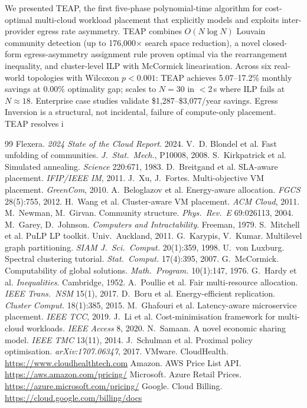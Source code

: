 \documentclass[sigconf,10pt]{acmart}
\begin{document}
We presented TEAP, the first five-phase polynomial-time algorithm for cost-optimal
multi-cloud workload placement that explicitly models and exploits inter-provider
egress rate asymmetry.
TEAP combines $O(N\log N)$ Louvain community detection (up to 176{,}000$\times$ search
space reduction), a novel closed-form egress-asymmetry assignment rule proven optimal
via the rearrangement inequality, and cluster-level ILP with McCormick linearisation.
Across six real-world topologies with Wilcoxon $p < 0.001$: TEAP achieves
5.07--17.2\% monthly savings at 0.00\% optimality gap; scales to $N=30$ in $<$2\,s
where ILP fails at $N\approx18$.
Enterprise case studies validate \$1,287--\$3,077/year savings.
Egress Inversion is a structural, not incidental, failure of compute-only placement.
TEAP resolves i
\begin{thebibliography}{99}
Flexera. \textit{2024 State of the Cloud Report}. 2024.
V.~D. Blondel et al. Fast unfolding of communities. \textit{J.~Stat.~Mech.}, P10008, 2008.
S.~Kirkpatrick et al. Simulated annealing. \textit{Science} 220:671, 1983.
D.~Breitgand et al. SLA-aware placement. \textit{IFIP/IEEE IM}, 2011.
J.~Xu, J.~Fortes. Multi-objective VM placement. \textit{GreenCom}, 2010.
A.~Beloglazov et al. Energy-aware allocation. \textit{FGCS} 28(5):755, 2012.
H.~Wang et al. Cluster-aware VM placement. \textit{ACM Cloud}, 2011.
M.~Newman, M.~Girvan. Community structure. \textit{Phys.~Rev.~E} 69:026113, 2004.
M.~Garey, D.~Johnson. \textit{Computers and Intractability}. Freeman, 1979.
S.~Mitchell et al. PuLP LP toolkit. Univ.~Auckland, 2011.
G.~Karypis, V.~Kumar. Multilevel graph partitioning. \textit{SIAM J.~Sci.~Comput.} 20(1):359, 1998.
U.~von Luxburg. Spectral clustering tutorial. \textit{Stat.~Comput.} 17(4):395, 2007.
G.~McCormick. Computability of global solutions. \textit{Math.~Program.} 10(1):147, 1976.
G.~Hardy et al. \textit{Inequalities}. Cambridge, 1952.
A.~Poullie et al. Fair multi-resource allocation. \textit{IEEE Trans.~NSM} 15(1), 2017.
D.~Boru et al. Energy-efficient replication. \textit{Cluster Comput.} 18(1):385, 2015.
M.~Ghafouri et al. Latency-aware microservice placement. \textit{IEEE TCC}, 2019.
J.~Li et al. Cost-minimisation framework for multi-cloud workloads. \textit{IEEE Access} 8, 2020.
N.~Samaan. A novel economic sharing model. \textit{IEEE TMC} 13(11), 2014.
J.~Schulman et al. Proximal policy optimisation. \textit{arXiv:1707.06347}, 2017.
VMware. CloudHealth. \url{https://www.cloudhealthtech.com}
Amazon. AWS Price List API. \url{https://aws.amazon.com/pricing/}
Microsoft. Azure Retail Prices. \url{https://azure.microsoft.com/pricing/}
Google. Cloud Billing. \url{https://cloud.google.com/billing/docs}
\end{thebibliography}
\end{document}
